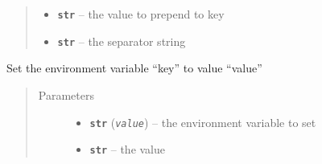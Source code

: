 \documentclass[a4paper,10pt,english]{sphinxmanual}
\begin{document}
\begin{fulllineitems}
\begin{fulllineitems}
\begin{quote}
\begin{description}
\begin{itemize}
\item {} 
\textbf{\texttt{str}} -- the value to prepend to key

\item {} 
\textbf{\texttt{str}} -- the separator string

\end{itemize}

\end{description}\end{quote}

\end{fulllineitems}


\begin{fulllineitems}
\label{commands/apidoc/src:src.fileEnviron.ContextFileEnviron.set}
Set the environment variable ``key'' to value ``value''
\begin{quote}\begin{description}
\item[{Parameters}] \leavevmode\begin{itemize}
\item {} 
\textbf{\texttt{str}} (\emph{\texttt{value}}) -- the environment variable to set

\item {} 
\textbf{\texttt{str}} -- the value

\end{itemize}

\end{description}\end{quote}

\end{fulllineitems}


\end{fulllineitems}

\end{document}
